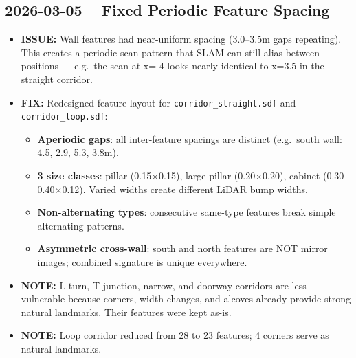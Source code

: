 \documentclass[11pt]{article}
\newcommand{\logentry}[1]{\subsection*{#1}}
\newcommand{\issue}[1]{\textcolor{issuered}{\textbf{ISSUE:} #1}}
\newcommand{\fix}[1]{\textcolor{fixgreen}{\textbf{FIX:} #1}}
\newcommand{\note}[1]{\textcolor{notblue}{\textbf{NOTE:} #1}}
\begin{document}
\logentry{2026-03-05 -- Fixed Periodic Feature Spacing}
\begin{itemize}
  \item \issue{Wall features had near-uniform spacing (3.0--3.5m gaps repeating). This creates a periodic scan pattern that SLAM can still alias between positions --- e.g.\ the scan at x=-4 looks nearly identical to x=3.5 in the straight corridor.}
  \item \fix{Redesigned feature layout for \texttt{corridor\_straight.sdf} and \texttt{corridor\_loop.sdf}:
    \begin{itemize}
      \item \textbf{Aperiodic gaps}: all inter-feature spacings are distinct (e.g.\ south wall: 4.5, 2.9, 5.3, 3.8m).
      \item \textbf{3 size classes}: pillar (0.15$\times$0.15), large-pillar (0.20$\times$0.20), cabinet (0.30--0.40$\times$0.12). Varied widths create different LiDAR bump widths.
      \item \textbf{Non-alternating types}: consecutive same-type features break simple alternating patterns.
      \item \textbf{Asymmetric cross-wall}: south and north features are NOT mirror images; combined signature is unique everywhere.
    \end{itemize}
  }
  \item \note{L-turn, T-junction, narrow, and doorway corridors are less vulnerable because corners, width changes, and alcoves already provide strong natural landmarks. Their features were kept as-is.}
  \item \note{Loop corridor reduced from 28 to 23 features; 4 corners serve as natural landmarks.}
\end{itemize}
\end{document}
